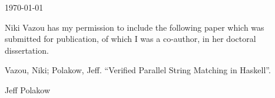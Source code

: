 \documentclass{article}
\begin{document}
\today

Niki Vazou has my permission to include the following paper which was
submitted for publication, of which I was a co-author, in her doctoral
dissertation.

Vazou, Niki; Polakow, Jeff.
``Verified Parallel String Matching in Haskell''.

\baselineskip
Jeff Polakow
\end{document}
